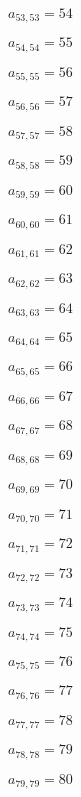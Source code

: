 \documentclass[a4paper,12pt]{article}
\begin{document}
$a _{ 53, 53 } = 54$

$a _{ 54, 54 } = 55$

$a _{ 55, 55 } = 56$

$a _{ 56, 56 } = 57$

$a _{ 57, 57 } = 58$

$a _{ 58, 58 } = 59$

$a _{ 59, 59 } = 60$

$a _{ 60, 60 } = 61$

$a _{ 61, 61 } = 62$

$a _{ 62, 62 } = 63$

$a _{ 63, 63 } = 64$

$a _{ 64, 64 } = 65$

$a _{ 65, 65 } = 66$

$a _{ 66, 66 } = 67$

$a _{ 67, 67 } = 68$

$a _{ 68, 68 } = 69$

$a _{ 69, 69 } = 70$

$a _{ 70, 70 } = 71$

$a _{ 71, 71 } = 72$

$a _{ 72, 72 } = 73$

$a _{ 73, 73 } = 74$

$a _{ 74, 74 } = 75$

$a _{ 75, 75 } = 76$

$a _{ 76, 76 } = 77$

$a _{ 77, 77 } = 78$

$a _{ 78, 78 } = 79$

$a _{ 79, 79 } = 80$
\end{document}
